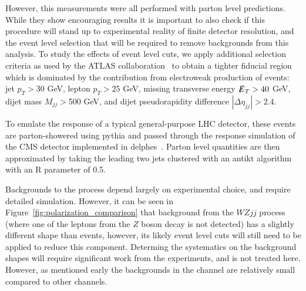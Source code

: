 However, this measurements were all performed with parton level predictions. While they show encouraging results  it is important 
to also check if this procedure will stand up to experimental reality of finite detector resolution, and the event level selection that
will be required to remove backgrounds from this analysis. To study the effects of event level cuts, we apply additional selection criteria as used by the ATLAS collaboration~\cite{ATLAS_ssWW} to obtain a
tighter fiducial region which is dominated by the contribution from electroweak production of \ssWW events: jet $p_T > 30$ GeV, lepton $p_T > 25$ GeV, missing transverse energy $\slashed{E}_T > 40$ GeV, 
dijet mass $M_{jj} > $500 GeV, and dijet pseudorapidity difference $|\Delta \eta_{jj}| > 2.4 $. 

To emulate the response of a typical general-purpose LHC detector, these events are parton-showered using {\sc pythia}\cite{pythia} and passed through the  response simulation of the CMS detector implemented in {\sc delphes}~\cite{delphes}. Parton level quantities are then approximated by taking the leading two jets clustered with an antikt algorithm~\cite{antikt} with an R parameter of 0.5.

Backgrounds to the \ssWW process depend largely on experimental choice, and require detailed simulation. However, it can be seen in Figure~\ref{fig:polarization_comparison} that background from the $WZjj$ process (where one of 
the leptons from the $Z$ boson decay is not detected) has a slightly different \ctNN shape than \ssWW events, however, its likely event level cuts will still need to be applied to reduce this component. Determing the systematics on the background shapes will require significant work from the experiments, and is not treated here. However, as mentioned early the backgrounds in the \ssWW channel are relatively small compared to other channels.

